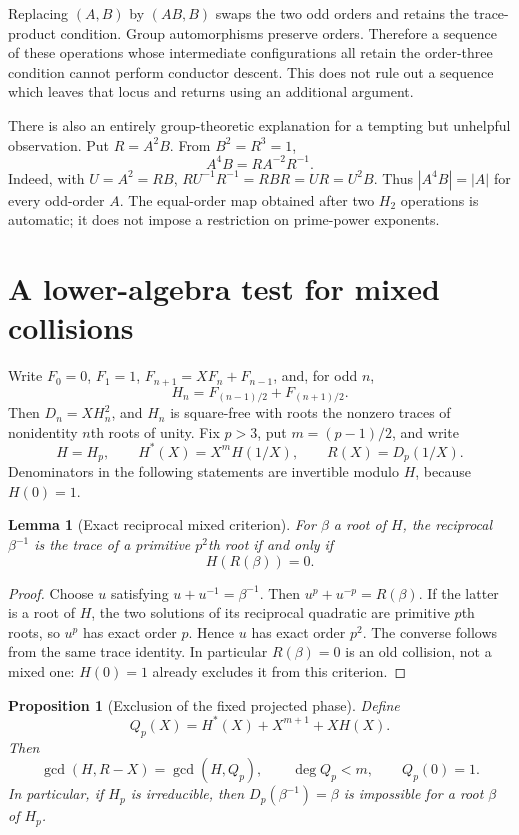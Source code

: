 \documentclass[a4paper]{article}
\newtheorem{proposition}[theorem]{Proposition}
\newtheorem{lemma}[theorem]{Lemma}
\begin{document}
Replacing $(A,B)$ by $(AB,B)$ swaps the two odd orders and retains
the trace-product condition.  Group automorphisms preserve orders.
Therefore a sequence of these operations whose intermediate
configurations all retain the order-three condition cannot perform
conductor descent.  This does not rule out a sequence which leaves
that locus and returns using an additional argument.

There is also an entirely group-theoretic explanation for a tempting
but unhelpful observation.  Put $R=A^2B$.  From $B^2=R^3=1$,
\[
 A^4B=R A^{-2}R^{-1}.
\]
Indeed, with $U=A^2=RB$,
$RU^{-1}R^{-1}=RBR=UR=U^2B$.
Thus $|A^4B|=|A|$ for every odd-order $A$.
The equal-order map obtained after two $H_2$ operations is automatic;
it does not impose a restriction on prime-power exponents.

\section{A lower-algebra test for mixed collisions}

Write $F_0=0$, $F_1=1$, $F_{n+1}=XF_n+F_{n-1}$, and, for odd $n$,
\[
 H_n=F_{(n-1)/2}+F_{(n+1)/2}.
\]
Then $D_n=XH_n^2$, and $H_n$ is square-free with roots the nonzero
traces of nonidentity $n$th roots of unity.
Fix $p>3$, put $m=(p-1)/2$, and write
\[
 H=H_p,\qquad H^*(X)=X^mH(1/X),\qquad R(X)=D_p(1/X).
\]
Denominators in the following statements are invertible modulo $H$,
because $H(0)=1$.

\begin{lemma}[Exact reciprocal mixed criterion]\label{lem:mixed}
For $\beta$ a root of $H$, the reciprocal $\beta^{-1}$ is the
trace of a primitive $p^2$th root if and only if
\[
 H(R(\beta))=0.
\]
\end{lemma}

\begin{proof}
Choose $u$ satisfying $u+u^{-1}=\beta^{-1}$.
Then $u^p+u^{-p}=R(\beta)$.
If the latter is a root of $H$, the two solutions of its reciprocal
quadratic are primitive $p$th roots, so $u^p$ has exact order $p$.
Hence $u$ has exact order $p^2$.
The converse follows from the same trace identity.
In particular $R(\beta)=0$ is an old collision, not a mixed one:
$H(0)=1$ already excludes it from this criterion.
\end{proof}

\begin{proposition}[Exclusion of the fixed projected phase]
\label{prop:fixed-phase}
Define
\[
 Q_p(X)=H^*(X)+X^{m+1}+XH(X).
\]
Then
\[
 \gcd(H,R-X)=\gcd(H,Q_p),\qquad
 \deg Q_p<m,\qquad Q_p(0)=1.
\]
In particular, if $H_p$ is irreducible, then
$D_p(\beta^{-1})=\beta$ is impossible for a root $\beta$ of $H_p$.
\end{proposition}
\end{document}
